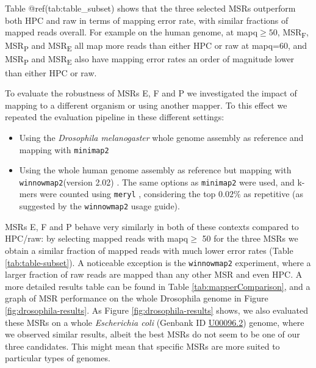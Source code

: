 \documentclass[
  11pt,
  twoside]{scrbook}
\begin{document}
Table @ref(tab:table\_subset) shows that the three selected MSRs outperform both HPC and raw in terms of mapping error rate, with similar fractions of mapped reads overall. For example on the human genome, at mapq\(\geq 50\), MSR\textsubscript{F}, MSR\textsubscript{P} and MSR\textsubscript{E} all map more reads than either HPC or raw at mapq=60, and MSR\textsubscript{P} and MSR\textsubscript{E} also have mapping error rates an order of magnitude lower than either HPC or raw.

To evaluate the robustness of MSRs E, F and P we investigated the impact of mapping to a different organism or using another mapper. To this effect we repeated the evaluation pipeline in these different settings:

\begin{itemize}
\item
  Using the \emph{Drosophila melanogaster} whole genome assembly as reference and mapping with \texttt{minimap2}
\item
  Using the whole human genome assembly as reference but mapping with \texttt{winnowmap2}(version 2.02) \autocite{jainWeightedMinimizerSampling2020}. The same options as \texttt{minimap2} were used, and k-mers were counted using \texttt{meryl} \autocite{rhieMerquryReferencefreeQuality2020}, considering the top \(0.02\%\) as repetitive (as suggested by the \texttt{winnowmap2} usage guide).
\end{itemize}

MSRs E, F and P behave very similarly in both of these contexts compared to HPC/raw: by selecting mapped reads with mapq\(\geq\) 50 for the three MSRs we obtain a similar fraction of mapped reads with much lower error rates (Table \ref{tab:table-subset}). A noticeable exception is the \texttt{winnowmap2} experiment, where a larger fraction of raw reads are mapped than any other MSR and even HPC. A more detailed results table can be found in Table \ref{tab:mapperComparison}, and a graph of MSR performance on the whole Drosophila genome in Figure \ref{fig:drosophila-results}. As Figure \ref{fig:drosophila-results} shows, we also evaluated these MSRs on a whole \emph{Escherichia coli} (Genbank ID \href{https://www.ncbi.nlm.nih.gov/nuccore/U00096.2}{U00096.2}) genome, where we observed similar results, albeit the best MSRs do not seem to be one of our three candidates. This might mean that specific MSRs are more suited to particular types of genomes.
\end{document}
